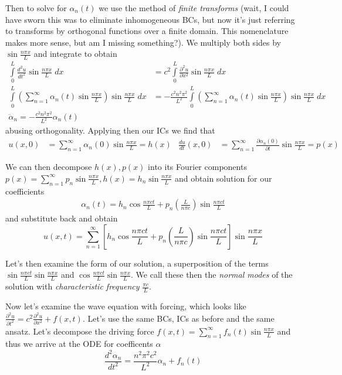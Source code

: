\documentclass[10pt]{report}
\newcommand{\rtd}[2]{\frac{d^2#1}{d#2^2}}
\newcommand{\ptd}[2]{\frac{\partial^2 #1}{\partial#2^2}}
\newcommand{\rd}[2]{\frac{d#1}{d#2}}
\newcommand{\pd}[2]{\frac{\partial #1}{\partial#2}}
\begin{document}
Then to solve for $\alpha_n(t)$ we use the method of \emph{finite transforms} (wait, I could have sworn this was to eliminate inhomogeneous BCs, but now it's just referring to transforms by orthogonal functions over a finite domain. This nomenclature makes more sense, but am I missing something?). We multiply both sides by $\sin \frac{n\pi x}{L}$ and integrate to obtain
\begin{align}
    \int\limits_{0}^{L}\rtd{u}{t}\sin \frac{n\pi x}{L}\;dx &= c^2 \int\limits_{0}^{L}\ptd{u}{x}\sin \frac{n\pi x}{L}\;dx\\
    \int\limits_{0}^{L}\left(\sum\limits_{n=1}^{\infty}\alpha_n(t)\sin \frac{n\pi x}{L}\right)\sin \frac{n\pi x}{L}\;dx&= -\frac{c^2 n^2 \pi^2}{L^2}\int\limits_{0}^{L}\left(\sum\limits_{n=1}^{\infty}\alpha_n(t)\sin \frac{n\pi x}{L}\right)\sin \frac{n\pi x}{L}\;dx\\
    \ddot{\alpha}_n = -\frac{c^2 n^2 \pi^2}{L^2}\alpha_n(t)
\end{align}
abusing orthogonality. Applying then our ICs we find that 
\begin{align}
    u(x,0) &= \sum\limits_{n=1}^{\infty} \alpha_n(0) \sin \frac{n\pi x}{L} = h(x) & \rd{u}{t}(x,0) &= \sum\limits_{n=1}^{\infty}\pd{\alpha_n(0)}{t}\sin \frac{n\pi x}{L} = p(x)
\end{align}

We can then decompose $h(x), p(x)$ into its Fourier components $p(x) = \sum\limits_{n=1}^{\infty}p_n\sin \frac{n\pi x}{L}, h(x) = h_n \sin\frac{n\pi x}{L}$ and obtain solution for our coefficients
\begin{align}
    \alpha_n(t) = h_n\cos \frac{n\pi ct}{L} + p_n\left( \frac{L}{n\pi c} \right)\sin \frac{n\pi ct}{L}
\end{align}
and substitute back and obtain
\begin{equation}
    u(x,t) = \sum\limits_{n=1}^{\infty}\left[ h_n\cos \frac{n\pi ct}{L} + p_n\left( \frac{L}{n\pi c} \right)\sin \frac{n\pi ct}{L} \right]\sin \frac{n\pi x}{L}
\end{equation}

Let's then examine the form of our solution, a superposition of the terms $\sin \frac{n\pi ct}{L}\sin \frac{n\pi x}{L}$ and $\cos \frac{n\pi ct}{L}\sin \frac{n\pi x}{L}$. We call these then the \emph{normal modes} of the solution with \emph{characteristic frequency} $\frac{\pi c}{L}$. 

Now let's examine the wave equation with forcing, which looks like $\ptd{u}{t} = c^2 \ptd{u}{x} + f(x,t)$. Let's use the same BCs, ICs as before and the same ansatz. Let's decompose the driving force $f(x,t) = \sum\limits_{n=1}^{\infty}f_n(t)\sin \frac{n\pi x}{L}$ and thus we arrive at the ODE for coefficents $\alpha$
\begin{equation}
    \rtd{\alpha_n}{t} = \frac{n^2 \pi^2 c^2}{L^2}\alpha_n + f_n(t)
\end{equation}
\end{document}
